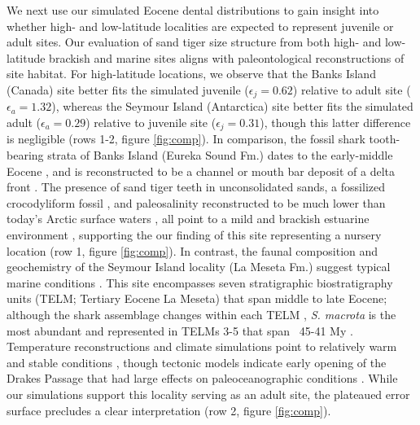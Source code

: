 \documentclass[]{rsos}%
\begin{document}
We next use our simulated Eocene dental distributions to gain insight into whether high- and low-latitude localities are expected to represent juvenile or adult sites.
Our evaluation of sand tiger size structure from both high- and low-latitude brackish and marine sites aligns with paleontological reconstructions of site habitat.
For high-latitude locations, we observe that the Banks Island (Canada) site better fits the simulated juvenile ($\epsilon_j = 0.62$) relative to adult site ($\epsilon_a=1.32$), whereas the Seymour Island (Antarctica) site better fits the simulated adult ($\epsilon_a = 0.29$) relative to juvenile site ($\epsilon_j = 0.31$), though this latter difference is negligible (rows 1-2, figure \ref{fig:comp}).
In comparison, the fossil shark tooth-bearing strata of Banks Island (Eureka Sound Fm.) dates to the early-middle Eocene \cite{Hopkins1974, Hopkins1975, Miall1979, Sweet2012, Padilla2014}, and is reconstructed to be a channel or mouth bar deposit of a delta front \cite{Miall1979}. %
The presence of sand tiger teeth in unconsolidated sands, a fossilized crocodyliform fossil \cite{eberle2014first}, and paleosalinity reconstructed to be much lower than today's Arctic surface waters \cite{Kim2014d, Waddell2008}, all point to a mild and brackish estuarine environment \cite{west2015arctic, west2020paleobotanical}, supporting the our finding of this site representing a nursery location (row 1, figure \ref{fig:comp}).
In contrast, the faunal composition and geochemistry of the Seymour Island locality (La Meseta Fm.) suggest typical marine conditions \cite{Stilwell1992, Marenssi1994, Ivany2008, Kriwet2016, Kim2020}.
This site encompasses seven stratigraphic biostratigraphy units (TELM; Tertiary Eocene La Meseta) that span middle to late Eocene; although the shark assemblage changes within each TELM \cite{Kriwet2016}, \emph{S. macrota} is the most abundant and represented in TELMs 3-5 that span ~45-41 My \cite{Amenabar2020,douglas2014pronounced, Kim2020}.
Temperature reconstructions and climate simulations point to relatively warm and stable conditions \cite{zhu2020simulation, Kim2020}, though tectonic models indicate early opening of the Drakes Passage \cite{eagles2006small} that had large effects on paleoceanographic conditions \cite{scher2006timing}.
While our simulations support this locality serving as an adult site, the plateaued error surface precludes a clear interpretation (row 2, figure \ref{fig:comp}).
\end{document}

